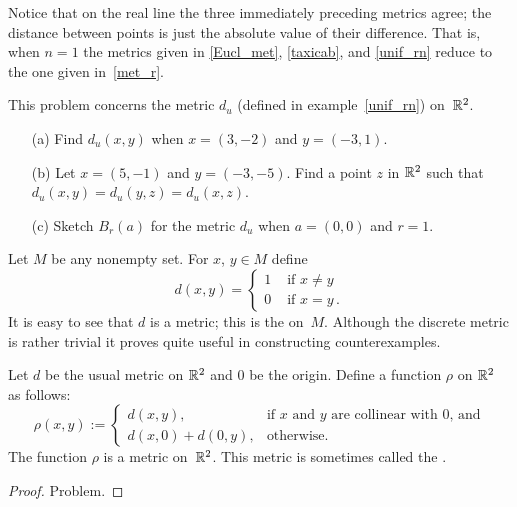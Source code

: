 Notice that on the real line the three immediately preceding metrics agree; the distance
between points is just the absolute value of their difference.  That is, when $n = 1$ the
metrics given in \ref{Eucl_met}, \ref{taxicab}, and \ref{unif_rn} reduce to the one given
in~\ref{met_r}.

\begin{prob} This problem concerns the metric $d_u$ (defined in example~\ref{unif_rn}) on~$\mathbb{R}^2$.
 \begin{enumerate}
  \item[(a)] Find $d_u(x,y)$ when $x = (3,-2)$ and $y=(-3,1)$.
  \item[(b)] Let $x=(5,-1)$ and $y=(-3,-5)$. Find a point $z$ in $\mathbb{R}^2$ such that $d_u(x,y)
= d_u(y,z) = d_u(x,z)$.
  \item[(c)] Sketch $B_r(a)$ for the metric $d_u$ when $a=(0,0)$ and $r = 1$.
 \end{enumerate}
\end{prob}

\begin{exam}\label{discrete} Let $M$ be any nonempty set. For $x$, $y \in M$ define
   \[ d(x,y) = \begin{cases} 1 &\text{ if } x\ne y \\
                             0 &\text{ if } x=y\,.
               \end{cases} \]
It is easy to see that $d$ is a metric; this is the
 on~$M$. Although the discrete metric is rather trivial it proves quite
useful in constructing counterexamples.
\end{exam}

\begin{exam}\label{Gam} Let $d$ be the usual metric on $\mathbb{R}^2$ and 0 be the origin. Define a
function $\rho$ on $\mathbb{R}^2$ as follows:
   \[\rho (x,y) := \begin{cases}
                      d(x,y), &\text{if $x$ and $y$ are collinear with 0, and} \\
             d(x,0) + d(0,y), &\text{otherwise.}
                   \end{cases} \]
The function $\rho$ is a metric on~$\mathbb{R}^2$.  This metric is sometimes called the
.
\end{exam}

\begin{proof} Problem. \ns  \end{proof}

